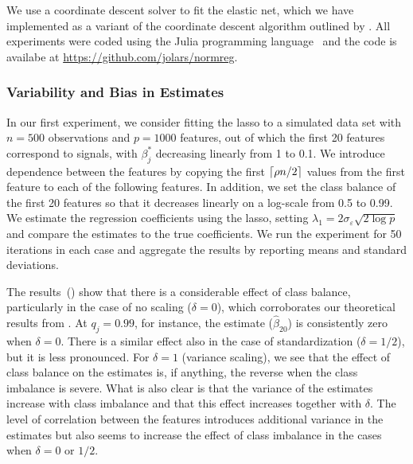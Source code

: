 We use a coordinate descent solver to fit the elastic net, which we have implemented as a
variant of the coordinate descent algorithm outlined by \citet{friedman2010}. All
experiments were coded using the Julia programming language~\citep{bezanson2017} and the
code is availabe at \url{https://github.com/jolars/normreg}.

\subsubsection{Variability and Bias in Estimates}\label{sec:experiments-varbias}

In our first experiment, we consider fitting the lasso to a simulated data set with
\(n=500\) observations and \(p = \num{1000}\) features, out of which the first 20 features
correspond to signals, with \(\beta_j^*\) decreasing linearly from 1 to 0.1. We introduce
dependence between the features by copying the first \(\lceil \rho n/2 \rceil\) values from the
first feature to each of the following features. In addition, we set the class balance of
the first 20 features so that it decreases linearly on a log-scale from 0.5 to 0.99. We
estimate the regression coefficients using the lasso, setting \(\lambda_1 = 2
\sigma_\varepsilon \sqrt{2 \log p }\) and compare the estimates to the true coefficients.
We run the experiment for 50 iterations in each case and aggregate the results by reporting
means and standard deviations.

The results~() show that there is a considerable effect of
class balance, particularly in the case of no scaling (\(\delta = 0\)), which corroborates
our theoretical results from . At \(q_j=0.99\), for
instance, the estimate (\(\hat{\beta}_{20}\)) is consistently zero when \(\delta = 0\).
There is a similar effect also in the case of standardization (\(\delta = 1/2\)), but it is
less pronounced. For \(\delta=1\) (variance scaling), we see that the effect of class
balance on the estimates is, if anything, the reverse when the class imbalance is severe.
What is also clear is that the variance of the estimates increase with class imbalance and
that this effect increases together with \(\delta\). The level of correlation between the
features introduces additional variance in the estimates but also seems to increase the
effect of class imbalance in the cases when \(\delta = 0\) or \(1/2\).

